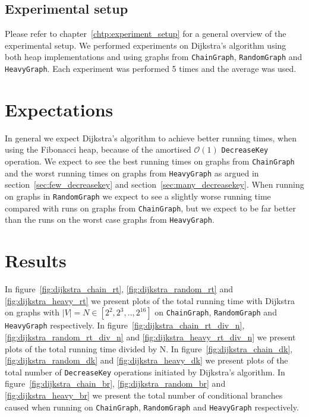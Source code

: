 \documentclass[a4paper,oneside,article,11pt]{memoir}
\begin{document}
\subsection{Experimental setup}
Please refer to chapter~\ref{chtp:experiment_setup} for a general overview of the experimental setup. We performed experiments on Dijkstra's algorithm using both heap implementations and using graphs from \texttt{ChainGraph}, \texttt{RandomGraph} and \texttt{HeavyGraph}. Each experiment was performed 5 times and the average was used.

\section{Expectations}
In general we expect Dijkstra's algorithm to achieve better running times, when using the Fibonacci heap, because of the amortised $\mathcal{O}(1)$ \texttt{DecreaseKey} operation. We expect to see the best running times on graphs from \texttt{ChainGraph} and the worst running times on graphs from \texttt{HeavyGraph} as argued in section~\ref{sec:few_decreasekey} and section~\ref{sec:many_decreasekey}. When running on graphs in \texttt{RandomGraph} we expect to see a slightly worse running time compared with runs on graphs from \texttt{ChainGraph}, but we expect to be far better than the runs on the worst case graphs from \texttt{HeavyGraph}.

\section{Results}

In figure~\ref{fig:dijkstra_chain_rt}, \ref{fig:dijkstra_random_rt} and \ref{fig:dijkstra_heavy_rt} we present plots of the total running time with Dijkstra on graphs with $\lvert V \lvert = N \in [2^2, 2^3, .., 2^{16}]$ on \texttt{ChainGraph}, \texttt{RandomGraph} and \texttt{HeavyGraph} respectively. In figure~\ref{fig:dijkstra_chain_rt_div_n}, \ref{fig:dijkstra_random_rt_div_n} and \ref{fig:dijkstra_heavy_rt_div_n} we present plots of the total running time divided by N. In figure~\ref{fig:dijkstra_chain_dk}, \ref{fig:dijkstra_random_dk} and \ref{fig:dijkstra_heavy_dk} we present plots of the total number of \texttt{DecreaseKey} operations initiated by Dijkstra's algorithm. In figure~\ref{fig:dijkstra_chain_br}, \ref{fig:dijkstra_random_br} and \ref{fig:dijkstra_heavy_br} we present the total number of conditional branches caused when running on \texttt{ChainGraph}, \texttt{RandomGraph} and \texttt{HeavyGraph} respectively. 
\end{document}
